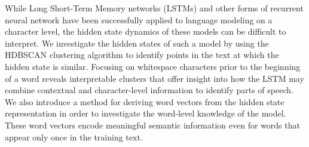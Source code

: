 While Long Short-Term Memory networks (LSTMs) and other forms of recurrent neural network have been successfully applied to language modeling on a character level, the hidden state dynamics of these models can be difficult to interpret. We investigate the hidden states of such a model by using the HDBSCAN clustering algorithm to identify points in the text at which the hidden state is similar. Focusing on whitespace characters prior to the beginning of a word reveals interpretable clusters that offer insight into how the LSTM may combine contextual and character-level information to identify parts of speech. We also introduce a method for deriving word vectors from the hidden state representation in order to investigate the word-level knowledge of the model. These word vectors encode meaningful semantic information even for words that appear only once in the training text.
